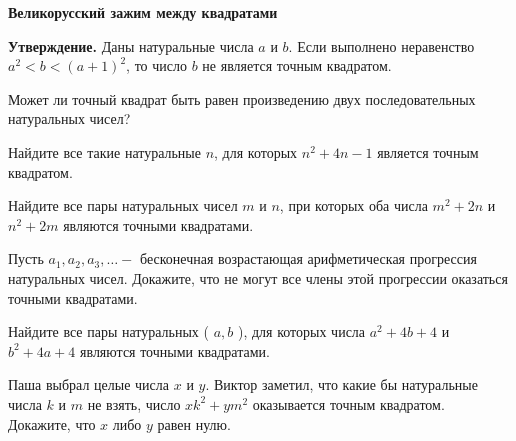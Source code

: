 \centerline{\bf \Huge Великорусский зажим между квадратами}

\begin{flushright}
        \scriptsize{}
\end{flushright}

\textbf{Утверждение.} Даны натуральные числа $a$ и $b$. Если выполнено неравенство $a^2<b<(a+1)^2$, то число $b$ не является точным квадратом.

Может ли точный квадрат быть равен произведению двух последовательных натуральных чисел?

Найдите все такие натуральные $n$, для которых $n^2+4 n-1$ является точным квадратом.

Найдите все пары натуральных чисел $m$ и $n$, при которых оба числа $m^2+2 n$ и $n^2+2 m$ являются точными квадратами.

Пусть $a_1, a_2, a_3, \ldots-$ бесконечная возрастающая арифметическая прогрессия натуральных чисел. Докажите, что не могут все члены этой прогрессии оказаться точными квадратами.

Найдите все пары натуральных ( $a, b$ ), для которых числа $a^2+4 b+4$ и $b^2+4 a+4$ являются точными квадратами.

Паша выбрал целые числа $x$ и $y$. Виктор заметил, что какие бы натуральные числа $k$ и $m$ не взять, число $x k^2+y m^2$ оказывается точным квадратом. Докажите, что $x$ либо $y$ равен нулю.